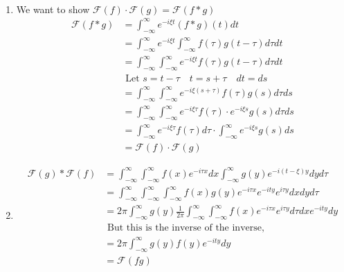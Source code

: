 \documentclass[letterpaper,12pt]{article}
\theoremstyle{definition}
\begin{document}
\\
\begin{enumerate}
    \item 
        We want to show $\mathscr{F}(f) \cdot \mathscr{F}(g) = \mathscr{F}(f*g)$
        \begin{align*}
            \mathscr{F}(f*g) &= \int_{-\infty}^\infty  e^{-i \xi t} (f*g)(t) dt \\
            & =   \int_{-\infty}^\infty e^{-i \xi t} \int_{-\infty}^\infty f(\tau) g(t-\tau)d\tau dt \\
            & = \int_{-\infty}^\infty \int_{-\infty}^\infty e^{-i \xi t} f(\tau) g(t-\tau) d\tau dt \\
            & \text{ Let }s = t - \tau\quad t = s+\tau \quad dt = ds \\
            & = \int_{-\infty}^\infty \int_{-\infty}^\infty e^{-i \xi (s+\tau)} f(\tau) g(s) d\tau ds \\
            & = \int_{-\infty}^\infty \int_{-\infty}^\infty e^{-i \xi \tau}f(\tau) \cdot e^{-i \xi s} g(s) d\tau ds \\
            & = \int_{-\infty}^\infty e^{-i \xi \tau} f(\tau) d\tau \cdot \int_{-\infty}^\infty  e^{-i\xi s } g(s)ds \\
            & = \mathscr{F}(f) \cdot \mathscr{F}(g)
        \end{align*}

    \item
        \begin{align*}
            \mathscr{F}(g)* \mathscr{F}(f) & = \int_{-\infty}^\infty \int_{-\infty}^\infty f(x)e^{-i\tau x} dx \int_{-\infty}^\infty g(y) e^{-i(t-\xi)y}dyd\tau \\
            & = \int_{-\infty}^\infty \int_{-\infty}^\infty \int_{-\infty}^\infty f(x)g(y)e^{-i \tau x}e^{-i t y}e^{i \tau y} dx dy d\tau \\
            & =2\pi  \int_{-\infty}^\infty g(y) \frac{1}{2\pi} \int_{-\infty}^\infty   \int_{-\infty}^\infty
            f(x)e^{-i \tau x} e^{i\tau y} d\tau dx e^{-i t y }dy \\
            & \text{ But this is the inverse of the inverse,  } \\
            & = 2 \pi \int_{-\infty}^\infty g(y)f(y)e^{-it y} dy \\
            & = \mathscr{F}(fg)
        \end{align*}
\end{enumerate}
\end{document}
